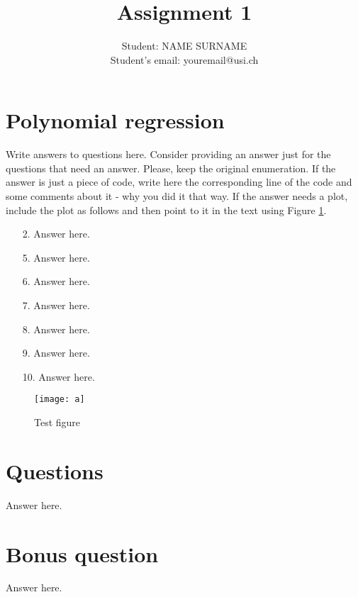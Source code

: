 \documentclass[a4paper]{article}
\title{Assignment 1}
\author{Student: NAME SURNAME\\Student's email: youremail@usi.ch} %
\date{}
\begin{document}
\maketitle

\section*{Polynomial regression}
Write answers to questions here. Consider providing an answer just for the questions that need an answer. Please, keep the original enumeration. If the answer is just a piece of code, write here the corresponding line of the code and some comments about it - why you did it that way. If the answer needs a plot, include the plot as follows and then point to it in the text using Figure \ref{fig:test}. 
\begin{enumerate}
     \item[2.] Answer here. 
     \item[5.] Answer here.
     \item[6.] Answer here. 
     \item[7.] Answer here.
     \item[8.] Answer here. 
     \item[9.] Answer here. 
     \item[10.] Answer here. 
 \end{enumerate}

 \begin{figure}
         \centering
         \texttt{[image: a]}
         \caption{Test figure}
         \label{fig:test}
     \end{figure}

\section*{Questions}
Answer here.

\section*{Bonus question}
Answer here.
\end{document}
